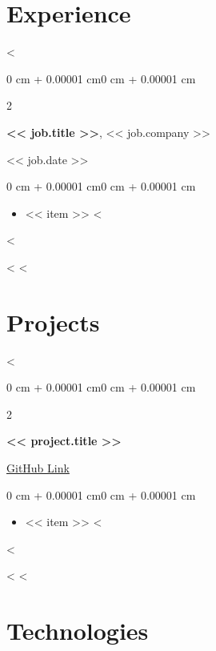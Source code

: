 \documentclass[10pt, letterpaper]{article}
\newenvironment{highlights}{
    \begin{itemize}[
        topsep=0.10 cm,
        parsep=0.10 cm,
        partopsep=0pt,
        itemsep=2pt,
        leftmargin=0 cm + 10pt
    ]
}{
    \end{itemize}
}
\newenvironment{onecolentry}{
    \begin{adjustwidth}{0 cm + 0.00001 cm}{0 cm + 0.00001 cm}
}{
    \end{adjustwidth}
}
\newenvironment{twocolentry}[2][]{
    \onecolentry
    \def\secondColumn{#2}
    \setcolumnwidth{\fill, 4.5 cm}
    \begin{paracol}{2}
}{
    \switchcolumn \raggedleft \secondColumn
    \end{paracol}
    \endonecolentry
}
\begin{document}
    \section{Experience}

<%
    \begin{twocolentry}{<< job.date >>}
        \textbf{<< job.title >>}, << job.company >>
    \end{twocolentry}

    \vspace{0.10cm}
    \begin{onecolentry}
        \begin{highlights}
<%
            \item << item >>
<%
        \end{highlights}
    \end{onecolentry}
<%

    \vspace{0.2cm}

<%
<%


    \section{Projects}

<%
    \begin{twocolentry}{
        \href{<< project.github_url >>}{GitHub Link}
    }
        \textbf{<< project.title >>}
    \end{twocolentry}

    \vspace{0.10 cm}
    \begin{onecolentry}
        \begin{highlights}
<%
            \item << item >>
<%
        \end{highlights}
    \end{onecolentry}
<%

    \vspace{0.2cm}

<%
<%


    \section{Technologies}

    \vspace{0.10cm}
\end{document}
